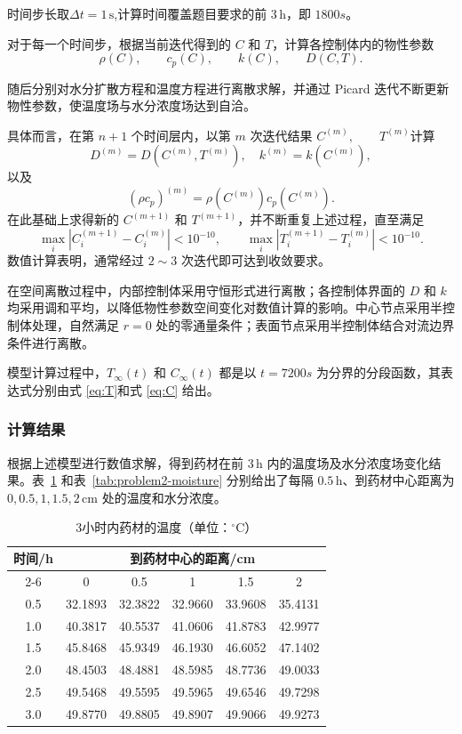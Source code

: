 \documentclass[12pt,a4paper]{article}
\begin{document}
时间步长取$\Delta t=1\,\mathrm{s}$,计算时间覆盖题目要求的前 $3\,\mathrm{h}$，即 $1800s$。

对于每一个时间步，根据当前迭代得到的 $C$ 和 $T$，计算各控制体内的物性参数
$$\rho(C),\qquad
c_p(C),\qquad
k(C),\qquad
D(C,T).$$


随后分别对水分扩散方程和温度方程进行离散求解，并通过 Picard 迭代不断更新物性参数，使温度场与水分浓度场达到自洽。

具体而言，在第 $n+1$ 个时间层内，以第 $m$ 次迭代结果 $C^{(m)},\qquad T^{(m)}$计算
$$D^{(m)}
=
D\left(C^{(m)},T^{(m)}\right),
\quad
k^{(m)}
=
k\left(C^{(m)}\right),$$
以及
$$\left(\rho c_p\right)^{(m)}
=
\rho\left(C^{(m)}\right)
c_p\left(C^{(m)}\right).$$
在此基础上求得新的 $C^{(m+1)}$ 和 $T^{(m+1)}$，并不断重复上述过程，直至满足
\begin{equation}
\max_i\left|C_i^{(m+1)}-C_i^{(m)}\right|
<10^{-10},
\qquad
\max_i\left|T_i^{(m+1)}-T_i^{(m)}\right|
<10^{-10}.
\end{equation}
数值计算表明，通常经过 $2\sim3$ 次迭代即可达到收敛要求。

在空间离散过程中，内部控制体采用守恒形式进行离散；各控制体界面的 $D$ 和 $k$ 均采用调和平均，以降低物性参数空间变化对数值计算的影响。中心节点采用半控制体处理，自然满足 $r=0$ 处的零通量条件；表面节点采用半控制体结合对流边界条件进行离散。

模型计算过程中，$T_\infty(t)$ 和 $C_\infty(t)$ 都是以 $t=7200s$ 为分界的分段函数，其表达式分别由式 \eqref{eq:T}和式 \eqref{eq:C} 给出。

\newpage

\subsubsection{计算结果}

根据上述模型进行数值求解，得到药材在前 \(3\,\mathrm{h}\) 内的温度场及水分浓度场变化结果。表~\ref{tab:problem2-temperature} 和表~\ref{tab:problem2-moisture} 分别给出了每隔 \(0.5\,\mathrm{h}\)、到药材中心距离为 \(0,0.5,1,1.5,2\,\mathrm{cm}\) 处的温度和水分浓度。

\begin{table}[htbp]
\centering
\caption{3小时内药材的温度（单位：\(^\circ\mathrm{C}\)）}
\label{tab:problem2-temperature}
\renewcommand{\arraystretch}{1.15}
\begin{tabular}{cccccc}
\toprule
\multirow{2}{*}{时间/h} & \multicolumn{5}{c}{到药材中心的距离/cm} \\
\cmidrule(lr){2-6}
 & 0 & 0.5 & 1 & 1.5 & 2 \\
\midrule
0.5 & 32.1893 & 32.3822 & 32.9660 & 33.9608 & 35.4131 \\
1.0 & 40.3817 & 40.5537 & 41.0606 & 41.8783 & 42.9977 \\
1.5 & 45.8468 & 45.9349 & 46.1930 & 46.6052 & 47.1402 \\
2.0 & 48.4503 & 48.4881 & 48.5985 & 48.7736 & 49.0033 \\
2.5 & 49.5468 & 49.5595 & 49.5965 & 49.6546 & 49.7298 \\
3.0 & 49.8770 & 49.8805 & 49.8907 & 49.9066 & 49.9273 \\
\bottomrule
\end{tabular}
\end{table}
\end{document}

